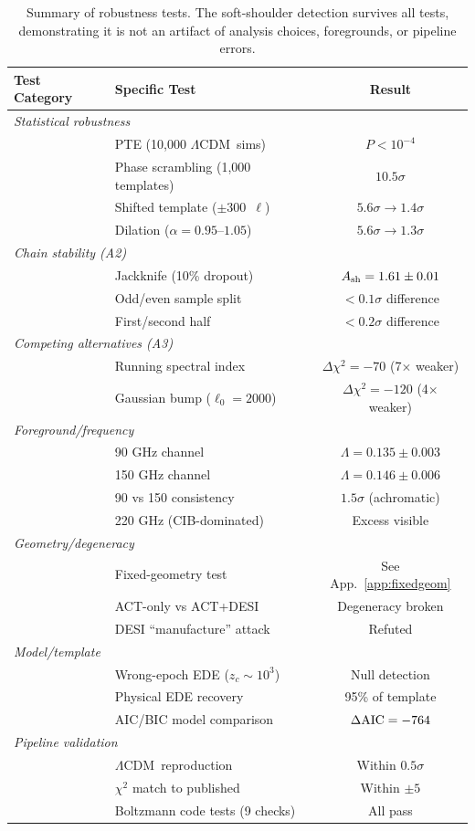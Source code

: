 \documentclass[twocolumn,showpacs,preprintnumbers,amsmath,amssymb,prd]{revtex4-2}
\newcommand{\lcdm}{$\Lambda$CDM}
\begin{document}
\begin{table}[t]
\centering
\caption{Summary of robustness tests. The soft-shoulder detection 
survives all tests, demonstrating it is not an artifact of analysis 
choices, foregrounds, or pipeline errors.}
\begin{tabular}{llc}
\toprule
Test Category & Specific Test & Result \\
\midrule
\multicolumn{3}{l}{\textit{Statistical robustness}} \\
& PTE (10,000 \lcdm\ sims) & $P < 10^{-4}$ \\
& Phase scrambling (1,000 templates) & $10.5\sigma$ \\
& Shifted template ($\pm 300$~$\ell$) & $5.6\sigma \to 1.4\sigma$ \\
& Dilation ($\alpha = 0.95$--$1.05$) & $5.6\sigma \to 1.3\sigma$ \\
\midrule
\multicolumn{3}{l}{\textit{Chain stability (A2)}} \\
& Jackknife (10\% dropout) & $A_{\rm sh} = 1.61 \pm 0.01$ \\
& Odd/even sample split & $< 0.1\sigma$ difference \\
& First/second half & $< 0.2\sigma$ difference \\
\midrule
\multicolumn{3}{l}{\textit{Competing alternatives (A3)}} \\
& Running spectral index & $\Delta\chi^2 = -70$ (7$\times$ weaker) \\
& Gaussian bump ($\ell_0 = 2000$) & $\Delta\chi^2 = -120$ (4$\times$ weaker) \\
\midrule
\multicolumn{3}{l}{\textit{Foreground/frequency}} \\
& 90 GHz channel & $\Lambda = 0.135 \pm 0.003$ \\
& 150 GHz channel & $\Lambda = 0.146 \pm 0.006$ \\
& 90 vs 150 consistency & $1.5\sigma$ (achromatic) \\
& 220 GHz (CIB-dominated) & Excess visible \\
\midrule
\multicolumn{3}{l}{\textit{Geometry/degeneracy}} \\
& Fixed-geometry test & See App.~\ref{app:fixedgeom} \\
& ACT-only vs ACT+DESI & Degeneracy broken \\
& DESI ``manufacture'' attack & Refuted \\
\midrule
\multicolumn{3}{l}{\textit{Model/template}} \\
& Wrong-epoch EDE ($z_c \sim 10^3$) & Null detection \\
& Physical EDE recovery & 95\% of template \\
& AIC/BIC model comparison & $\Delta\rm{AIC} = -764$ \\
\midrule
\multicolumn{3}{l}{\textit{Pipeline validation}} \\
& \lcdm\ reproduction & Within $0.5\sigma$ \\
& $\chi^2$ match to published & Within $\pm 5$ \\
& Boltzmann code tests (9 checks) & All pass \\
\bottomrule
\end{tabular}
\label{tab:robustness_summary}
\end{table}
\end{document}
